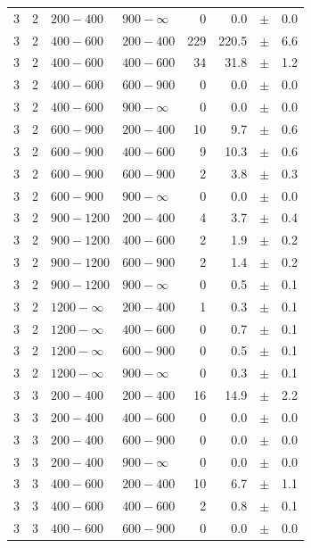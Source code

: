 \begin{table}[!t]
\begin{tabular}{rrllrrcl}
3 & 2 & $ 200- 400$ & $900-\infty$ &      0 &      0.0 &$\pm$&    0.0 \\
3 & 2 & $ 400- 600$ & $200-400$ &    229 &    220.5 &$\pm$&    6.6 \\
3 & 2 & $ 400- 600$ & $400-600$ &     34 &     31.8 &$\pm$&    1.2 \\
3 & 2 & $ 400- 600$ & $600-900$ &      0 &      0.0 &$\pm$&    0.0 \\
3 & 2 & $ 400- 600$ & $900-\infty$ &      0 &      0.0 &$\pm$&    0.0 \\
3 & 2 & $ 600- 900$ & $200-400$ &     10 &      9.7 &$\pm$&    0.6 \\
3 & 2 & $ 600- 900$ & $400-600$ &      9 &     10.3 &$\pm$&    0.6 \\
3 & 2 & $ 600- 900$ & $600-900$ &      2 &      3.8 &$\pm$&    0.3 \\
3 & 2 & $ 600- 900$ & $900-\infty$ &      0 &      0.0 &$\pm$&    0.0 \\
3 & 2 & $ 900-1200$ & $200-400$ &      4 &      3.7 &$\pm$&    0.4 \\
3 & 2 & $ 900-1200$ & $400-600$ &      2 &      1.9 &$\pm$&    0.2 \\
3 & 2 & $ 900-1200$ & $600-900$ &      2 &      1.4 &$\pm$&    0.2 \\
3 & 2 & $ 900-1200$ & $900-\infty$ &      0 &      0.5 &$\pm$&    0.1 \\
3 & 2 & $1200- \infty$ & $200-400$ &      1 &      0.3 &$\pm$&    0.1 \\
3 & 2 & $1200- \infty$ & $400-600$ &      0 &      0.7 &$\pm$&    0.1 \\
3 & 2 & $1200- \infty$ & $600-900$ &      0 &      0.5 &$\pm$&    0.1 \\
3 & 2 & $1200- \infty$ & $900-\infty$ &      0 &      0.3 &$\pm$&    0.1 \\
3 & 3 & $ 200- 400$ & $200-400$ &     16 &     14.9 &$\pm$&    2.2 \\
3 & 3 & $ 200- 400$ & $400-600$ &      0 &      0.0 &$\pm$&    0.0 \\
3 & 3 & $ 200- 400$ & $600-900$ &      0 &      0.0 &$\pm$&    0.0 \\
3 & 3 & $ 200- 400$ & $900-\infty$ &      0 &      0.0 &$\pm$&    0.0 \\
3 & 3 & $ 400- 600$ & $200-400$ &     10 &      6.7 &$\pm$&    1.1 \\
3 & 3 & $ 400- 600$ & $400-600$ &      2 &      0.8 &$\pm$&    0.1 \\
3 & 3 & $ 400- 600$ & $600-900$ &      0 &      0.0 &$\pm$&    0.0 \\

\end{tabular}
\end{table}
